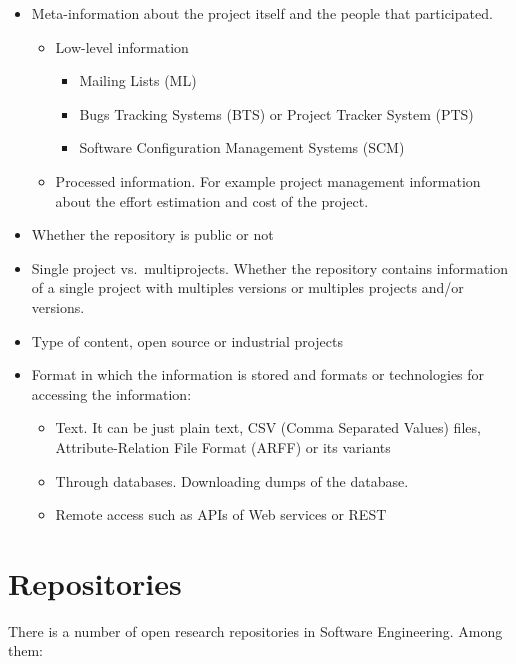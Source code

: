 \documentclass[]{book}
\theoremstyle{definition}
\theoremstyle{definition}
\theoremstyle{remark}
\begin{document}
\begin{itemize}
\item
  Meta-information about the project itself and the people that
  participated.

  \begin{itemize}
  \item
    Low-level information

    \begin{itemize}
    \item
      Mailing Lists (ML)
    \item
      Bugs Tracking Systems (BTS) or Project Tracker System (PTS)
    \item
      Software Configuration Management Systems (SCM)
    \end{itemize}
  \item
    Processed information. For example project management information
    about the effort estimation and cost of the project.
  \end{itemize}
\item
  Whether the repository is public or not
\item
  Single project vs.~multiprojects. Whether the repository contains
  information of a single project with multiples versions or multiples
  projects and/or versions.
\item
  Type of content, open source or industrial projects
\item
  Format in which the information is stored and formats or technologies
  for accessing the information:

  \begin{itemize}
  \item
    Text. It can be just plain text, CSV (Comma Separated Values) files,
    Attribute-Relation File Format (ARFF) or its variants
  \item
    Through databases. Downloading dumps of the database.
  \item
    Remote access such as APIs of Web services or REST
  \end{itemize}
\end{itemize}

\chapter{Repositories}\label{repositories}

There is a number of open research repositories in Software Engineering.
Among them:
\end{document}
